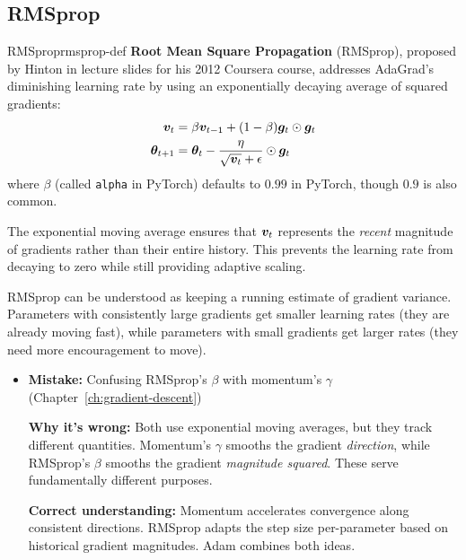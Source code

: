 \documentclass[../../main.tex]{subfiles}
\begin{document}
\subsection{RMSprop}

\begin{definition}{RMSprop}{rmsprop-def}
\textbf{Root Mean Square Propagation} (RMSprop), proposed by Hinton in lecture slides for his 2012 Coursera course, addresses AdaGrad's diminishing learning rate by using an exponentially decaying average of squared gradients:
\begin{align}
    \boldsymbol{v}_t &= \beta \boldsymbol{v}_{t-1} + (1 - \beta) \boldsymbol{g}_t \odot \boldsymbol{g}_t \\
    \boldsymbol{\theta}_{t+1} &= \boldsymbol{\theta}_t - \frac{\eta}{\sqrt{\boldsymbol{v}_t} + \epsilon} \odot \boldsymbol{g}_t
\end{align}
where $\beta$ (called \texttt{alpha} in PyTorch) defaults to $0.99$ in PyTorch, though $0.9$ is also common.
\end{definition}

The exponential moving average ensures that $\boldsymbol{v}_t$ represents the \textit{recent} magnitude of gradients rather than their entire history. This prevents the learning rate from decaying to zero while still providing adaptive scaling.

\begin{intuition}
RMSprop can be understood as keeping a running estimate of gradient variance. Parameters with consistently large gradients get smaller learning rates (they are already moving fast), while parameters with small gradients get larger rates (they need more encouragement to move).
\end{intuition}

\begin{commonmistakes}
\begin{itemize}
    \item \textbf{Mistake:} Confusing RMSprop's $\beta$ with momentum's $\gamma$ (Chapter~\ref{ch:gradient-descent})

    \textbf{Why it's wrong:} Both use exponential moving averages, but they track different quantities. Momentum's $\gamma$ smooths the gradient \textit{direction}, while RMSprop's $\beta$ smooths the gradient \textit{magnitude squared}. These serve fundamentally different purposes.

    \textbf{Correct understanding:} Momentum accelerates convergence along consistent directions. RMSprop adapts the step size per-parameter based on historical gradient magnitudes. Adam combines both ideas.
\end{itemize}
\end{commonmistakes}
\end{document}
